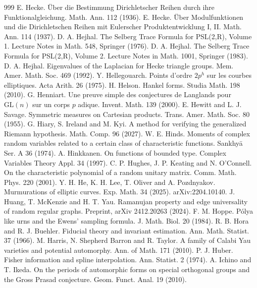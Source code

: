 \begin{thebibliography}{999}
 E. Hecke. \"Uber die Bestimmung Dirichletscher Reihen durch ihre Funktionalgleichung. Math. Ann. 112 (1936).
 E. Hecke. \"Uber Modulfunktionen und die Dirichletschen Reihen mit Eulerscher Produktentwicklung I, II. Math. Ann. 114 (1937).
 D. A. Hejhal. The Selberg Trace Formula for PSL(2,R), Volume 1. Lecture Notes in Math. 548, Springer (1976).
 D. A. Hejhal. The Selberg Trace Formula for PSL(2,R), Volume 2. Lecture Notes in Math. 1001, Springer (1983).
 D. A. Hejhal. Eigenvalues of the Laplacian for Hecke triangle groups. Mem. Amer. Math. Soc. 469 (1992).
 Y. Hellegouarch. Points d'ordre $2p^h$ sur les courbes elliptiques. Acta Arith. 26 (1975).
 H. Helson. Hankel forms. Studia Math. 198 (2010).
 G. Henniart. Une preuve simple des conjectures de Langlands pour $\mathrm{GL}(n)$ sur un corps $p$ adique. Invent. Math. 139 (2000).
 E. Hewitt and L. J. Savage. Symmetric measures on Cartesian products. Trans. Amer. Math. Soc. 80 (1955).
 G. Hiary, S. Ireland and M. Kyi. A method for verifying the generalized Riemann hypothesis. Math. Comp. 96 (2027).
 W. E. Hinds. Moments of complex random variables related to a certain class of characteristic functions. Sankhy\=a Ser. A 36 (1974).
 A. Hinkkanen. On functions of bounded type. Complex Variables Theory Appl. 34 (1997).
 C. P. Hughes, J. P. Keating and N. O'Connell. On the characteristic polynomial of a random unitary matrix. Comm. Math. Phys. 220 (2001).
 Y. H. He, K. H. Lee, T. Oliver and A. Pozdnyakov. Murmurations of elliptic curves. Exp. Math. 34 (2025). arXiv:2204.10140.
 J. Huang, T. McKenzie and H. T. Yau. Ramanujan property and edge universality of random regular graphs. Preprint, arXiv 2412.20263 (2024).
 F. M. Hoppe. P\'olya like urns and the Ewens' sampling formula. J. Math. Biol. 20 (1984).
 R. B. Hora and R. J. Buehler. Fiducial theory and invariant estimation. Ann. Math. Statist. 37 (1966).
 M. Harris, N. Shepherd Barron and R. Taylor. A family of Calabi Yau varieties and potential automorphy. Ann. of Math. 171 (2010).
 P. J. Huber. Fisher information and spline interpolation. Ann. Statist. 2 (1974).
 A. Ichino and T. Ikeda. On the periods of automorphic forms on special orthogonal groups and the Gross Prasad conjecture. Geom. Funct. Anal. 19 (2010).

\end{thebibliography}
